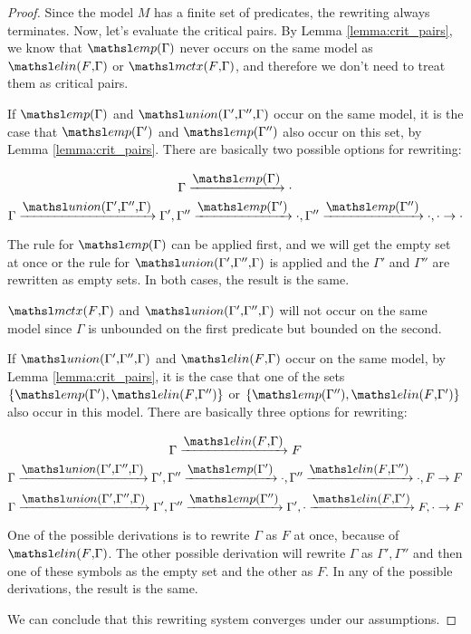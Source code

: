 \begin{proof}
Since the model $M$ has a finite set of predicates, the rewriting always
terminates. Now, let's evaluate the critical pairs. By Lemma
\ref{lemma:crit_pairs}, we know that $\emp{\Gamma}$ never occurs on the same
model as $\elin{F}{\Gamma}$ or $\mctx{F}{\Gamma}$, and therefore we don't need to
treat them as critical pairs. 

If $\emp{\Gamma}$ and
$\union{\Gamma'}{\Gamma''}{\Gamma}$ occur on the same model, it is the case that
$\emp{\Gamma'}$ and $\emp{\Gamma''}$ also occur on this set, by Lemma
\ref{lemma:crit_pairs}. There are basically two possible options for rewriting:

$$\Gamma \xrightarrow{{\scriptstyle \emp{\Gamma}}} \cdot$$
$$\Gamma \xrightarrow{{\scriptstyle \union{\Gamma'}{\Gamma''}{\Gamma}}} \Gamma', \Gamma''
\xrightarrow{{\scriptstyle \emp{\Gamma'}}} \cdot, \Gamma''
\xrightarrow{{\scriptstyle \emp{\Gamma''}}} \cdot,
\cdot \rightarrow \cdot$$

The rule for $\emp{\Gamma}$ can be applied first, and we will get the empty set at once or
the rule for $\union{\Gamma'}{\Gamma''}{\Gamma}$ is applied and the $\Gamma'$
and $\Gamma''$ are rewritten as empty sets. In both cases, the result is the
same.

$\mctx{F}{\Gamma}$ and $\union{\Gamma'}{\Gamma''}{\Gamma}$ will not occur on the
same model since $\Gamma$ is unbounded on the first predicate but bounded on the
second.

If $\union{\Gamma'}{\Gamma''}{\Gamma}$ and $\elin{F}{\Gamma}$ occur on the same
model, by Lemma \ref{lemma:crit_pairs}, it is the case that one of the sets $\{
\emp{\Gamma'}, \elin{F}{\Gamma''} \}$ or $\{ \emp{\Gamma''}, \elin{F}{\Gamma'}
\}$ also occur in this model. There are basically three options for rewriting:

$$\Gamma \xrightarrow{{\scriptstyle \elin{F}{\Gamma}}} F$$
$$\Gamma \xrightarrow{{\scriptstyle \union{\Gamma'}{\Gamma''}{\Gamma}}} \Gamma', \Gamma''
\xrightarrow{{\scriptstyle \emp{\Gamma'}}} \cdot, \Gamma''
\xrightarrow{{\scriptstyle \elin{F}{\Gamma''}}} \cdot,
F \rightarrow F$$
$$\Gamma \xrightarrow{{\scriptstyle \union{\Gamma'}{\Gamma''}{\Gamma}}} \Gamma', \Gamma''
\xrightarrow{{\scriptstyle \emp{\Gamma''}}} \Gamma', \cdot
\xrightarrow{{\scriptstyle \elin{F}{\Gamma'}}} F,
\cdot \rightarrow F$$

One of the possible derivations is to rewrite
$\Gamma$ as $F$ at once, because of $\elin{F}{\Gamma}$. The other possible
derivation will rewrite $\Gamma$ as $\Gamma', \Gamma''$ and then one of these
symbols as the empty set and the other as $F$. In any of the possible
derivations, the result is the same.

We can conclude that this rewriting system converges under our assumptions.
\end{proof}

